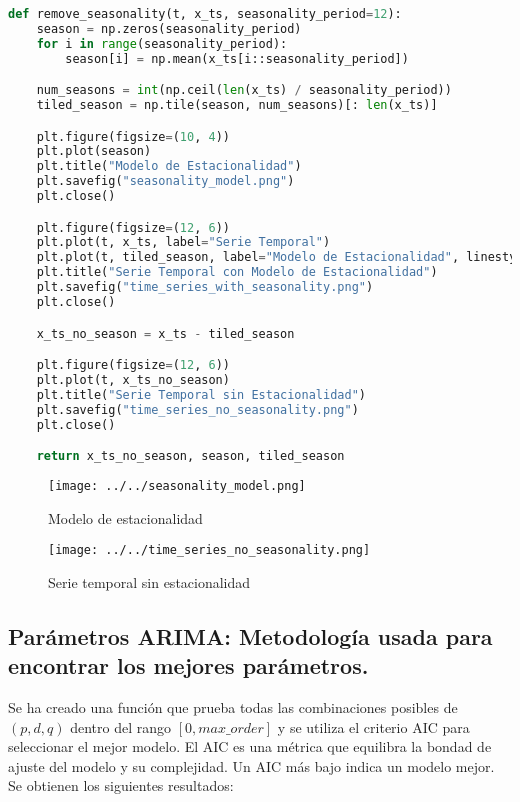 \documentclass[12pt,letterpaper]{article}
\begin{document}
\begin{lstlisting}[language=Python]
def remove_seasonality(t, x_ts, seasonality_period=12):
    season = np.zeros(seasonality_period)
    for i in range(seasonality_period):
        season[i] = np.mean(x_ts[i::seasonality_period])

    num_seasons = int(np.ceil(len(x_ts) / seasonality_period))
    tiled_season = np.tile(season, num_seasons)[: len(x_ts)]

    plt.figure(figsize=(10, 4))
    plt.plot(season)
    plt.title("Modelo de Estacionalidad")
    plt.savefig("seasonality_model.png")
    plt.close()

    plt.figure(figsize=(12, 6))
    plt.plot(t, x_ts, label="Serie Temporal")
    plt.plot(t, tiled_season, label="Modelo de Estacionalidad", linestyle="--")
    plt.title("Serie Temporal con Modelo de Estacionalidad")
    plt.savefig("time_series_with_seasonality.png")
    plt.close()

    x_ts_no_season = x_ts - tiled_season

    plt.figure(figsize=(12, 6))
    plt.plot(t, x_ts_no_season)
    plt.title("Serie Temporal sin Estacionalidad")
    plt.savefig("time_series_no_seasonality.png")
    plt.close()

    return x_ts_no_season, season, tiled_season
\end{lstlisting}

\begin{figure}[htp]
    \centering
    \texttt{[image: ../../seasonality\_model.png]}
    \caption{Modelo de estacionalidad}
    \label{fig:seasonality_m}
\end{figure}
\begin{figure}[htp]
    \centering
    \texttt{[image: ../../time\_series\_no\_seasonality.png]}
    \caption{Serie temporal sin estacionalidad}
    \label{fig:noseasonality_m}
\end{figure}

\subsection{Parámetros ARIMA: Metodología usada para encontrar los mejores parámetros.}
Se ha creado una función que prueba todas las combinaciones posibles de $(p, d, q)$ dentro del rango $[0, max\_order]$ y se utiliza el criterio AIC para seleccionar el mejor modelo. El AIC es una métrica que equilibra la bondad de ajuste del modelo y su complejidad. Un AIC más bajo indica un modelo mejor. Se obtienen los siguientes resultados:
\end{document}
